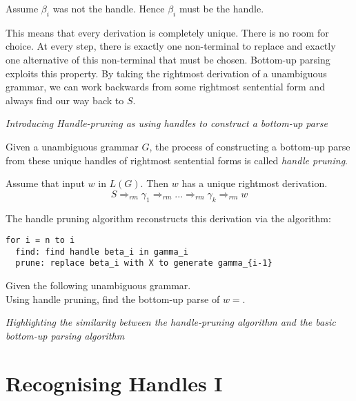 Assume $\beta_i$ was not the handle.
Hence $\beta_i$ must be the handle.



This means that every derivation is completely unique. 
There is no room for choice. At every step, there is exactly 
one non-terminal to replace and exactly one alternative of this non-terminal that must be chosen. 
Bottom-up parsing exploits this property. By taking the rightmost derivation 
of a unambiguous grammar, we can work backwards from some rightmost sentential form 
and always find our way back to $S$. 


\frmrule 

\textit{Introducing Handle-pruning as using handles to construct a bottom-up parse} 


Given a unambiguous grammar $G$, 
the process of constructing a bottom-up parse from these unique handles of rightmost sentential forms
is called \textit{handle pruning}. 

Assume that input $w$ in $L(G)$. Then $w$ has a unique rightmost derivation. 
$$S \Rightarrow_{rm} \gamma_1 \Rightarrow_{rm} ... \Rightarrow_{rm} \gamma_k \Rightarrow_{rm} w$$ 

The handle pruning algorithm reconstructs this derivation via the algorithm:
\begin{lstlisting}
for i = n to i
  find: find handle beta_i in gamma_i
  prune: replace beta_i with X to generate gamma_{i-1}
\end{lstlisting}


\frmrule 

\begin{example}
Given the following unambiguous grammar. \\
Using handle pruning, find the bottom-up parse of $w = $.
\end{example}

\frmrule 

\textit{Highlighting the similarity between the handle-pruning algorithm 
and the basic bottom-up parsing algorithm} 




\frmrule 





\section{Recognising Handles I}





